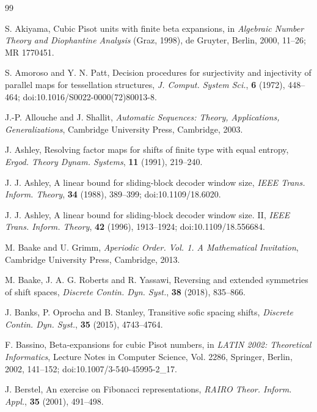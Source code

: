 \begin{thebibliography}{99}

S. Akiyama, Cubic Pisot units with finite beta expansions,
in \textit{Algebraic Number Theory and Diophantine Analysis} (Graz, 1998),
de Gruyter, Berlin, 2000, 11--26; MR 1770451.

S. Amoroso and Y. N. Patt,
Decision procedures for surjectivity and injectivity of parallel maps for
tessellation structures,
\textit{J. Comput. System Sci.}, \textbf{6} (1972), 448--464;
doi:10.1016/S0022-0000(72)80013-8.

J.-P. Allouche and J. Shallit, \textit{Automatic Sequences: Theory, Applications, Generalizations}, Cambridge University Press, Cambridge, 2003.

J. Ashley, Resolving factor maps for shifts of finite type with equal entropy, \textit{Ergod. Theory Dynam. Systems}, \textbf{11} (1991), 219--240.

J. J. Ashley, A linear bound for sliding-block decoder window size,
\textit{IEEE Trans. Inform. Theory}, \textbf{34} (1988), 389--399;
doi:10.1109/18.6020.

J. J. Ashley, A linear bound for sliding-block decoder window size. II,
\textit{IEEE Trans. Inform. Theory}, \textbf{42} (1996), 1913--1924;
doi:10.1109/18.556684.

M. Baake and U. Grimm, \textit{Aperiodic Order. Vol. 1. A Mathematical Invitation}, Cambridge University Press, Cambridge, 2013.

M. Baake, J. A. G. Roberts and R. Yassawi, Reversing and extended symmetries of shift spaces, \textit{Discrete Contin. Dyn. Syst.}, \textbf{38} (2018), 835--866.

J. Banks, P. Oprocha and B. Stanley, Transitive sofic spacing shifts, \textit{Discrete Contin. Dyn. Syst.}, \textbf{35} (2015), 4743--4764.

F. Bassino, Beta-expansions for cubic Pisot numbers,
in \textit{LATIN 2002: Theoretical Informatics}, Lecture Notes in Computer
Science, Vol. 2286, Springer, Berlin, 2002, 141--152;
doi:10.1007/3-540-45995-2\_17.

J. Berstel, An exercise on Fibonacci representations, \textit{RAIRO Theor. Inform. Appl.}, \textbf{35} (2001), 491--498.


\end{thebibliography}
